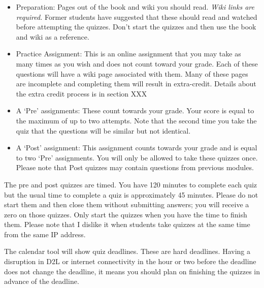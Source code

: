 \documentclass[letterpaper,10pt]{article}
\begin{document}
\begin{itemize}
\item Preparation: Pages out of the book and wiki you should read.
  \emph{Wiki links are required.}  Former students have suggested that these should read and watched before attempting the quizzes.  Don't start the quizzes and then use the book and wiki as a reference.
  
  \item Practice Assignment: This is an online assignment that you may take as many times as you wish and does not count toward your grade. Each of these questions will have a wiki page associated with them. Many of these pages are incomplete and completing them will result in extra-credit. Details about the extra credit process is in section XXX

\item A `Pre' assignments: These count towards your grade.
  Your score is equal to the maximum of up to two attempts. Note that the second time you take the quiz that the questions will be similar but not identical. 

\item A `Post' assignment: This assignment counts
  towards your grade and is equal to two `Pre' assignments.  You will
  only be allowed to take these quizzes once.  Please note that Post quizzes may contain questions from previous modules.

 
\end{itemize}

 The pre and post quizzes are timed. You have 120 minutes to complete each quiz but the usual time to complete a quiz is approximately 45 minutes.  Please do not start them and
  then close them without submitting answers; you will receive a zero on those quizzes.  Only start the quizzes when you have the time to
  finish them.  Please note that I dislike it when students take
  quizzes at the same time from the same IP address.






The calendar tool will show quiz deadlines. These are hard deadlines.  Having a disruption in D2L or internet connectivity in the hour or two before the deadline does not change the deadline, it means you should plan on finishing the quizzes in advance of the deadline.
\end{document}
